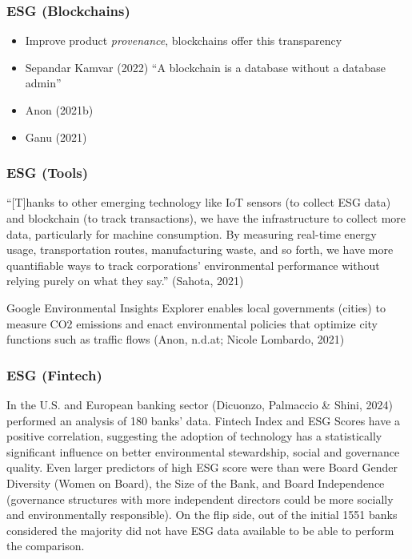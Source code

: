 \documentclass[
  letterpaper,
  DIV=11,
  numbers=noendperiod]{scrartcl}
\begin{document}
\subsubsection{ESG (Blockchains)}\label{esg-blockchains}

\begin{itemize}
\item
  Improve product \emph{provenance}, blockchains offer this transparency
\item
  Sepandar Kamvar (2022) ``A blockchain is a database without a database
  admin''
\item
  Anon (2021b)
\item
  Ganu (2021)
\end{itemize}

\subsubsection{ESG (Tools)}\label{esg-tools}

``{[}T{]}hanks to other emerging technology like IoT sensors (to collect
ESG data) and blockchain (to track transactions), we have the
infrastructure to collect more data, particularly for machine
consumption. By measuring real-time energy usage, transportation routes,
manufacturing waste, and so forth, we have more quantifiable ways to
track corporations' environmental performance without relying purely on
what they say.'' (Sahota, 2021)

Google Environmental Insights Explorer enables local governments
(cities) to measure CO2 emissions and enact environmental policies that
optimize city functions such as traffic flows (Anon, n.d.at; Nicole
Lombardo, 2021)

\subsubsection{ESG (Fintech)}\label{esg-fintech}

In the U.S. and European banking sector (Dicuonzo, Palmaccio \& Shini,
2024) performed an analysis of 180 banks' data. Fintech Index and ESG
Scores have a positive correlation, suggesting the adoption of
technology has a statistically significant influence on better
environmental stewardship, social and governance quality. Even larger
predictors of high ESG score were than were Board Gender Diversity
(Women on Board), the Size of the Bank, and Board Independence
(governance structures with more independent directors could be more
socially and environmentally responsible). On the flip side, out of the
initial 1551 banks considered the majority did not have ESG data
available to be able to perform the comparison.
\end{document}
